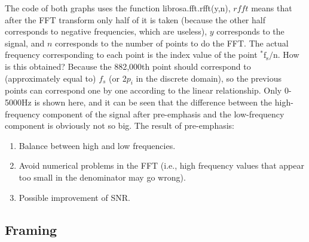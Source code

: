 The code of both graphs uses the function librosa.fft.rfft(y,n), $rfft$ means that after the FFT transform only half of it is taken (because the other half corresponds to negative frequencies, which are useless), $y$ corresponds to the signal, and $n$ corresponds to the number of points to do the FFT. The actual frequency corresponding to each point is the index value of the point ${ }^{*} \mathrm{f_{s}} / \mathrm{n}$. How is this obtained? Because the 882,000th point should correspond to (approximately equal to) $f_{s}$ (or 2$p_{i}$ in the discrete domain), so the previous points can correspond one by one according to the linear relationship. Only 0-5000Hz is shown here, and it can be seen that the difference between the high-frequency component of the signal after pre-emphasis and the low-frequency component is obviously not so big.
The result of pre-emphasis:
\begin{enumerate}[\qquad  1.]
	\item Balance between high and low frequencies.
	\item Avoid numerical problems in the FFT (i.e., high frequency values that appear too small in the denominator may go wrong).
	\item Possible improvement of SNR.
\end{enumerate}

\subsection{Framing}

